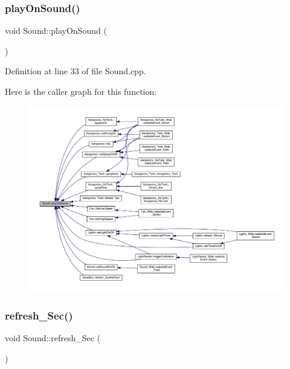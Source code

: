 \mbox{\label{class_sound_a038f9173934d27db8004ded6db667df6}} 
\subsubsection{\texorpdfstring{play\+On\+Sound()}{playOnSound()}\hspace{0.1cm}{\footnotesize\ttfamily [2/2]}}
{\footnotesize\ttfamily void Sound\+::play\+On\+Sound (\begin{DoxyParamCaption}{ }\end{DoxyParamCaption})}



Definition at line 33 of file Sound.\+cpp.

Here is the caller graph for this function\+:
\nopagebreak
\begin{figure}[H]
\begin{center}
\leavevmode
\includegraphics[width=350pt]{class_sound_a038f9173934d27db8004ded6db667df6_icgraph}
\end{center}
\end{figure}
\mbox{\label{class_sound_a747a131af54af0747775b918aa3f7925}} 
\subsubsection{\texorpdfstring{refresh\+\_\+\+Sec()}{refresh\_Sec()}\hspace{0.1cm}{\footnotesize\ttfamily [1/2]}}
{\footnotesize\ttfamily void Sound\+::refresh\+\_\+\+Sec (\begin{DoxyParamCaption}{ }\end{DoxyParamCaption})\hspace{0.3cm}{\ttfamily [virtual]}}



